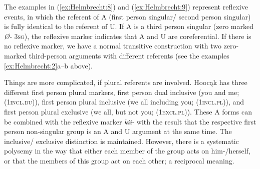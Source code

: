 \documentclass[output=paper]{langscibook}
\begin{document}
\ea \label{ex:Helmbrecht:9}  
	\z
\z 

The examples in (\ref{ex:Helmbrecht:8}) and (\ref{ex:Helmbrecht:9}) represent reflexive events, in which the referent of A (first person singular/ second person singular) is fully identical to the referent of U. If A is a third person singular (zero marked \textit{Ø-} 3\textsc{sg}), the reflexive marker indicates that A and U are coreferential. If there is no reflexive marker, we have a normal transitive construction with two zero-marked third-person arguments with different referents (see the examples \ref{ex:Helmbrecht:2}a--b above). 

Things are more complicated, if plural referents are involved. Hoocąk has three different first person plural markers, first person dual inclusive (you and me; (1\textsc{incl.du})), first person plural inclusive (we all including you; (1\textsc{incl.pl})), and first person plural exclusive (we all, but not you; (1\textsc{excl.pl})). These A forms can be combined with the reflexive marker \textit{kii-} with the result that the respective first person non-singular group is an A and U argument at the same time. The inclusive/ exclusive distinction is maintained. However, there is a systematic polysemy in the way that either each member of the group acts on him-/herself, or that the members of this group act on each other; a reciprocal meaning. 
\end{document}
